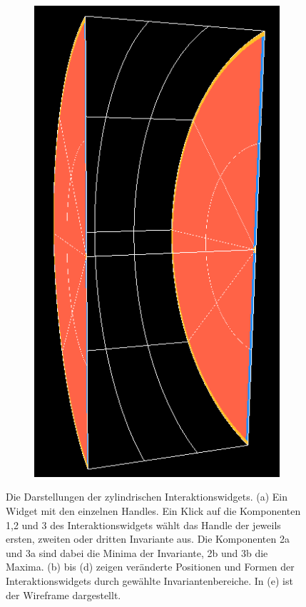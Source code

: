 \documentclass[a4paper,fontsize=12pt,toc=bib,halfparskip]{scrartcl}
\begin{document}
\begin{figure}
\begin{subfigure}{0.15\textwidth}
		\includegraphics[width=\textwidth]{pictures/InteractionPlanes5.png}
		\subcaption{}
		\label{InteractionPlaneE}
	\end{subfigure}
	\hspace*{\fill}
	\caption{Die Darstellungen der zylindrischen Interaktionswidgets. (a) Ein Widget mit den einzelnen Handles. Ein Klick auf die Komponenten 1,2 und 3 des Interaktionswidgets w\"ahlt das Handle der jeweils ersten, zweiten oder dritten Invariante aus. Die Komponenten 2a und 3a sind dabei die Minima der Invariante, 2b und 3b die Maxima. (b) bis (d) zeigen ver\"anderte Positionen und Formen der Interaktionswidgets durch gew\"ahlte Invariantenbereiche. In (e) ist der Wireframe dargestellt.}
\end{figure}
\end{document}

